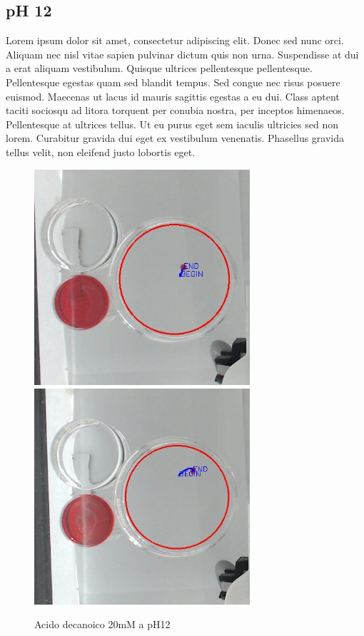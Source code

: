\subsection{pH 12}
Lorem ipsum dolor sit amet, consectetur adipiscing elit. Donec sed nunc orci. Aliquam nec nisl vitae sapien pulvinar dictum quis non urna. Suspendisse at dui a erat aliquam vestibulum. Quisque ultrices pellentesque pellentesque. Pellentesque egestas quam sed blandit tempus. Sed congue nec risus posuere euismod. Maecenas ut lacus id mauris sagittis egestas a eu dui. Class aptent taciti sociosqu ad litora torquent per conubia nostra, per inceptos himenaeos. Pellentesque at ultrices tellus. Ut eu purus eget sem iaculis ultricies sed non lorem. Curabitur gravida dui eget ex vestibulum venenatis. Phasellus gravida tellus velit, non eleifend justo lobortis eget. 
\begin{figure}[h]
	\centering
   		{\includegraphics[width=8cm]{immagini/20mMpH12-1.jpg}}
 	\hspace{2mm}   	
		{\includegraphics[width=8cm]{immagini/20mMpH12-2.jpg}}
	\caption{Acido decanoico 20mM a pH12}
\end{figure}
